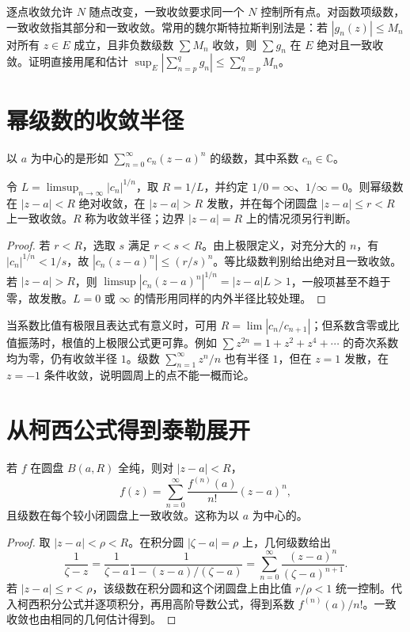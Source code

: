 \documentclass[UTF8,12pt,a4paper,fontset=fandol]{ctexbook}
\begin{document}
逐点收敛允许 $N$ 随点改变，一致收敛要求同一个 $N$ 控制所有点。对函数项级数，一致收敛指其部分和一致收敛。常用的魏尔斯特拉斯判别法是：若 $|g_n(z)|\le M_n$ 对所有 $z\in E$ 成立，且非负数级数 $\sum M_n$ 收敛，则 $\sum g_n$ 在 $E$ 绝对且一致收敛。证明直接用尾和估计 $\sup_E|\sum_{n=p}^qg_n|\le\sum_{n=p}^qM_n$。

\section{幂级数的收敛半径}

\begin{definition}[幂级数]
以 $a$ 为中心的是形如 $\sum_{n=0}^\infty c_n(z-a)^n$ 的级数，其中系数 $c_n\in\mathbb C$。
\end{definition}

\begin{theorem}[收敛半径公式]
\label{thm:cv-radius}
令 $L=\limsup_{n\to\infty}|c_n|^{1/n}$，取 $R=1/L$，并约定 $1/0=\infty$、$1/\infty=0$。则幂级数在 $|z-a|<R$ 绝对收敛，在 $|z-a|>R$ 发散，并在每个闭圆盘 $|z-a|\le r<R$ 上一致收敛。$R$ 称为收敛半径；边界 $|z-a|=R$ 上的情况须另行判断。
\end{theorem}
\begin{proof}
若 $r<R$，选取 $s$ 满足 $r<s<R$。由上极限定义，对充分大的 $n$，有 $|c_n|^{1/n}<1/s$，故 $|c_n(z-a)^n|\le(r/s)^n$。等比级数判别给出绝对且一致收敛。若 $|z-a|>R$，则 $\limsup|c_n(z-a)^n|^{1/n}=|z-a|L>1$，一般项甚至不趋于零，故发散。$L=0$ 或 $\infty$ 的情形用同样的内外半径比较处理。
\end{proof}

当系数比值有极限且表达式有意义时，可用 $R=\lim|c_n/c_{n+1}|$；但系数含零或比值振荡时，根值的上极限公式更可靠。例如 $\sum z^{2n}=1+z^2+z^4+\cdots$ 的奇次系数均为零，仍有收敛半径 $1$。级数 $\sum_{n=1}^\infty z^n/n$ 也有半径 $1$，但在 $z=1$ 发散，在 $z=-1$ 条件收敛，说明圆周上的点不能一概而论。

\section{从柯西公式得到泰勒展开}

\begin{theorem}[泰勒定理与解析性]
\label{thm:cv-taylor}
若 $f$ 在圆盘 $B(a,R)$ 全纯，则对 $|z-a|<R$，
\begin{equation}
 f(z)=\sum_{n=0}^\infty\frac{f^{(n)}(a)}{n!}(z-a)^n,
 \label{eq:cv-taylor}
\end{equation}
且级数在每个较小闭圆盘上一致收敛。这称为以 $a$ 为中心的。
\end{theorem}
\begin{proof}
取 $|z-a|<\rho<R$。在积分圆 $|\zeta-a|=\rho$ 上，几何级数给出
\[
 \frac1{\zeta-z}
 =\frac1{\zeta-a}\frac1{1-(z-a)/(\zeta-a)}
 =\sum_{n=0}^\infty\frac{(z-a)^n}{(\zeta-a)^{n+1}}.
\]
若 $|z-a|\le r<\rho$，该级数在积分圆和这个闭圆盘上由比值 $r/\rho<1$ 统一控制。代入柯西积分公式并逐项积分，再用高阶导数公式，得到系数 $f^{(n)}(a)/n!$。一致收敛也由相同的几何估计得到。
\end{proof}
\end{document}
